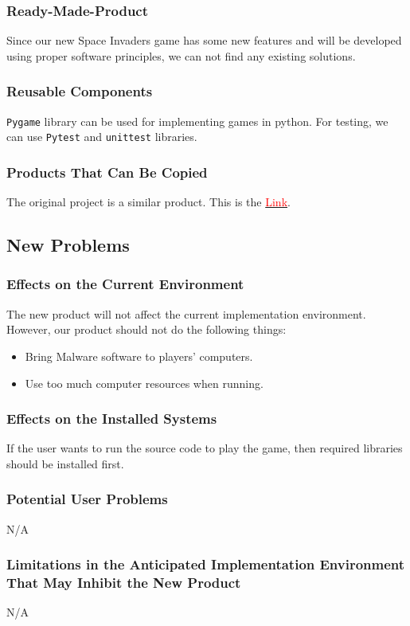 \documentclass[12pt]{article}
\begin{document}
\subsubsection{Ready-Made-Product}
Since our new Space Invaders game has some new features
and  will
be developed using proper software principles, we can not
find any existing solutions.
\subsubsection{Reusable Components}
\verb|Pygame| library can be used for implementing games in python.
For testing, we can use \verb|Pytest| and \verb|unittest|
libraries.
\subsubsection{Products That Can Be Copied}
The original project is a similar product. This is the \href{https://github.com/leerob/space-invaders}{\textcolor{red}{Link}}.\\
\subsection{New Problems}
\subsubsection{Effects on the Current Environment}
The new product will not affect the current implementation
environment. However, our product should not do the following 
things:
\begin{itemize}
\item Bring Malware software to players' computers.
\item Use too much computer resources when running.
\end{itemize}
\subsubsection{Effects on the Installed Systems}
If the user wants to run the source code to play the game, then required 
libraries should be installed first.
\subsubsection{Potential User Problems}
N/A
\subsubsection{Limitations in the Anticipated Implementation Environment That May Inhibit the New Product}
N/A
\end{document}
